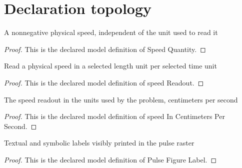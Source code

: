 \section{Declaration topology}
\begin{definition}
  \label{def:physics:phyx-mini-0301:phyxminiproblems-problemphyxmini0301-speedquantity}
  A nonnegative physical speed, independent of the unit used to read it
\end{definition}
\begin{proof}
  This is the declared model definition of Speed Quantity.
\end{proof}
\begin{definition}
  \label{def:physics:phyx-mini-0301:phyxminiproblems-problemphyxmini0301-speedreadout}
  Read a physical speed in a selected length unit per selected time unit
\end{definition}
\begin{proof}
  This is the declared model definition of speed Readout.
\end{proof}
\begin{definition}
  \label{def:physics:phyx-mini-0301:phyxminiproblems-problemphyxmini0301-speedincentimeterspersecond}
  The speed readout in the units used by the problem, centimeters per second
\end{definition}
\begin{proof}
  This is the declared model definition of speed In Centimeters Per Second.
\end{proof}
\begin{definition}
  \label{def:physics:phyx-mini-0301:phyxminiproblems-problemphyxmini0301-pulsefigurelabel}
  Textual and symbolic labels visibly printed in the pulse raster
\end{definition}
\begin{proof}
  This is the declared model definition of Pulse Figure Label.
\end{proof}
